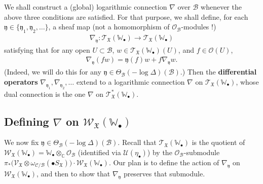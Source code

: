 \documentclass[12pt,b5paper,notitlepage]{report}
\theoremstyle{definition}
\theoremstyle{plain}
\newcommand{\fk}{\mathfrak}
\newcommand{\mc}{\mathcal}
\newcommand{\scr}{\mathscr}
\newcommand{\blt}{\bullet}
\newcommand{\Wbb}{\mathbb W}
\newcommand{\Cbb}{\mathbb C}
\numberwithin{equation}{section}
\begin{document}
We shall construct a (global) logarithmic connection $\nabla$ over $\mc B$ whenever the above three conditions are satisfied.  For that purpose, we shall define, for each  $\fk y\in\{\fk y_1,\fk y_2,\dots \}$, a sheaf map (not a homomorphism of $\scr O_{\mc B}$-modules !)
\begin{align*}
\nabla_{\fk y}:\scr T_{\fk X}(\Wbb_\blt)\rightarrow\scr T_{\fk X}(\Wbb_\blt)
\end{align*}
satisfying that for any open $U\subset \mc B$, $w\in\scr T_{\fk X}(\Wbb_\blt)(U)$, and $f\in\scr O(U)$,
\begin{align*}
\nabla_{\fk y}(fw)=\fk y(f)w+f\nabla_{\fk y}w.
\end{align*}
(Indeed, we will do this for any $\fk y\in \Theta_{\mc B}(-\log\Delta)(\mc B)$.) Then the  \textbf{differential operators} $\nabla_{\fk y_1},\nabla_{\fk y_2},\dots$ extend to a logarithmic connection $\nabla$ on $\scr T_{\fk X}(\Wbb_\blt)$, whose dual  connection  is the one $\nabla$ on $\scr T_{\fk X}^*(\Wbb_\blt)$.



\subsection*{Defining $\nabla$ on $\scr W_{\fk X}(\Wbb_\blt)$}

We now fix $\fk y\in \Theta_{\mc B}(-\log\Delta)(\mc B)$. Recall that $\scr T_{\fk X}(\Wbb_\blt)$ is the quotient of $\scr W_{\fk X}(\Wbb_\blt)=\Wbb_\blt\otimes_\Cbb \scr O_{\mc B}$ (identified via $\mc U(\eta_\blt)$) by the $\scr O_{\mc B}$-submodule $\pi_*\big(\scr V_{\fk X}\otimes\omega_{\mc C/\mc B}(\blt S_{\fk X})\big)\cdot \scr W_{\fk X}(\Wbb_\blt)$. Our plan is to  define the action of $\nabla_{\fk y}$ on $\scr W_{\fk X}(\Wbb_\blt)$, and then to show that $\nabla_{\fk y}$ preserves that submodule.
\end{document}
